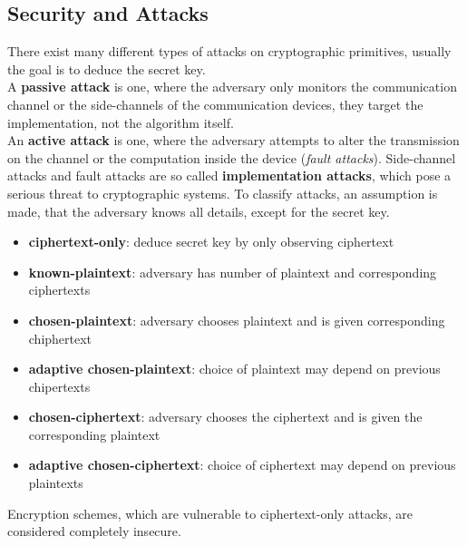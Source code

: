 \documentclass[a4paper, 10 pt, conference]{ieeeconf}
\begin{document}
\subsection{\textbf{Security and Attacks}} 
There exist many different types of attacks on cryptographic primitives, usually the goal is to deduce the secret key. \\
A \textbf{passive attack} is one, where the adversary only monitors the communication channel or the side-channels of the communication devices, they target the implementation, not the algorithm itself. \\
An \textbf{active attack} is one, where the adversary attempts to alter the transmission on the channel or the computation inside the device (\emph{fault attacks}). 
Side-channel attacks and fault attacks are so called \textbf{implementation attacks}, which pose a serious threat to cryptographic systems. 
To classify attacks, an assumption is made, that the adversary knows all details, except for the secret key. 
\begin{itemize}
\item \textbf{ciphertext-only}: deduce secret key by only observing ciphertext
\item \textbf{known-plaintext}: adversary has number of plaintext and corresponding ciphertexts
\item \textbf{chosen-plaintext}: adversary chooses plaintext and is given corresponding chiphertext
\item \textbf{adaptive chosen-plaintext}: choice of plaintext may depend on previous chipertexts
\item \textbf{chosen-ciphertext}: adversary chooses the ciphertext and is given the corresponding plaintext
\item \textbf{adaptive chosen-ciphertext}: choice of ciphertext may depend on previous plaintexts
\end{itemize}
Encryption schemes, which are vulnerable to ciphertext-only attacks, are considered completely insecure. 

\vspace{0.5cm}
\end{document}

